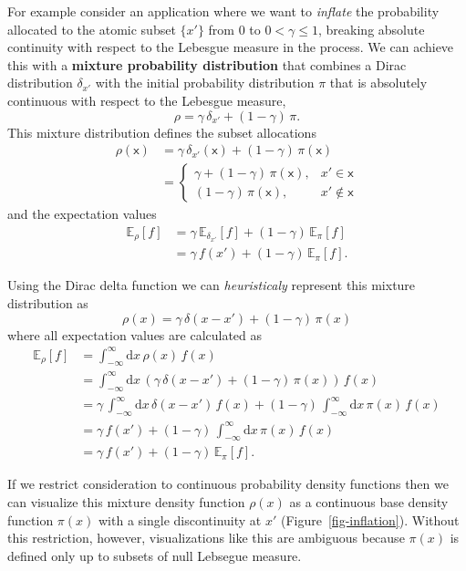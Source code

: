 \documentclass[
  letterpaper,
  DIV=11,
  numbers=noendperiod]{scrartcl}
\begin{document}
For example consider an application where we want to \emph{inflate} the
probability allocated to the atomic subset \(\{ x' \}\) from \(0\) to
\(0 < \gamma \le 1\), breaking absolute continuity with respect to the
Lebesgue measure in the process. We can achieve this with a
\textbf{mixture probability distribution} that combines a Dirac
distribution \(\delta_{x'}\) with the initial probability distribution
\(\pi\) that is absolutely continuous with respect to the Lebesgue
measure, \[
\rho = \gamma \, \delta_{x'} + (1 - \gamma) \, \pi.
\] This mixture distribution defines the subset allocations
\begin{align*}
\rho(\mathsf{x})
&=
  \gamma \, \delta_{x'}(\mathsf{x})
+ (1 - \gamma) \, \pi(\mathsf{x})
\\
&=
\left\{
\begin{array}{rr}
\gamma + (1 - \gamma) \, \pi(\mathsf{x}), & x' \in \mathsf{x} \\
(1 - \gamma) \, \pi(\mathsf{x}), & x' \notin \mathsf{x}
\end{array}
\right.
\end{align*} and the expectation values \begin{align*}
\mathbb{E}_{\rho}[f]
&=
  \gamma \, \mathbb{E}_{\delta_{x'}}[f]
+ (1 - \gamma) \, \mathbb{E}_{\pi}[f]
\\
&=
\gamma \, f(x') + (1 - \gamma) \, \mathbb{E}_{\pi}[f].
\end{align*}

Using the Dirac delta function we can \emph{heuristicaly} represent this
mixture distribution as \[
\rho(x) = \gamma \, \delta(x - x') + (1 - \gamma) \, \pi(x)
\] where all expectation values are calculated as \begin{align*}
\mathbb{E}_{\rho}[f]
&=
\int_{-\infty}^{\infty} \mathrm{d} x \, \rho(x) \, f(x)
\\
&=
\int_{-\infty}^{\infty} \mathrm{d} x \,
\left( \gamma \, \delta(x - x') + (1 - \gamma) \, \pi(x) \right) \, f(x)
\\
&=
\gamma \, \int_{-\infty}^{\infty} \mathrm{d} x \, \delta(x - x') \, f(x)
+ (1 - \gamma) \, \int_{-\infty}^{\infty} \mathrm{d} x \, \pi(x) \, f(x)
\\
&=
\gamma \, f(x')
+ (1 - \gamma) \, \int_{-\infty}^{\infty} \mathrm{d} x \, \pi(x) \, f(x)
\\
&=
\gamma \, f(x') + (1 - \gamma) \, \mathbb{E}_{\pi}[f].
\end{align*}

If we restrict consideration to continuous probability density functions
then we can visualize this mixture density function \(\rho(x)\) as a
continuous base density function \(\pi(x)\) with a single discontinuity
at \(x'\) (Figure~\ref{fig-inflation}). Without this restriction,
however, visualizations like this are ambiguous because \(\pi(x)\) is
defined only up to subsets of null Lebsegue measure.
\end{document}
